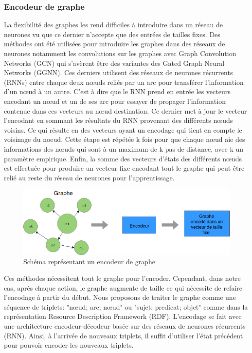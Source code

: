 \subsubsection*{Encodeur de graphe}
La flexibilité des graphes les rend difficiles à introduire dans un réseau de neurones vu que ce dernier n'accepte que des entrées de tailles fixes. Des méthodes ont été utilisées pour introduire les graphes dans des réseaux de neurones notamment les convolutions sur les graphes avec Graph Convolution Networks (GCN)\citep{KipfW17} qui s'avèrent être des variantes des Gated Graph Neural Networks (GGNN)\citep{Li2016GatedGS}. Ces derniers utilisent des réseaux de neurones récurrents (RNNs) entre chaque deux n\oe{}uds reliés par un arc pour transférer l'information d'un n\oe{}ud à un autre. C'est à dire que le RNN prend en entrée les vecteurs encodant un n\oe{}ud et un de ses arc pour essayer de propager l'information contenue dans ces vecteurs au n\oe{}ud destination. Ce dernier met à jour le vecteur l'encodant en sommant les résultats du RNN provenant des différents n\oe{}uds voisins. Ce qui résulte en des vecteurs ayant un encodage qui tient en compte le voisinage du noeud. Cette étape est répétée k fois pour que chaque n\oe{}ud aie des informations des n\oe{}uds qui sont à un maximum de k pas de distance, avec k un paramètre empirique. Enfin, la somme des vecteurs d'états des différents n\oe{}uds est effectuée pour produire un vecteur fixe encodant tout le graphe qui peut être relié au reste du réseau de neurones pour l'apprentissage.
\begin{figure}[H] 
	\centering
	\includegraphics[width=0.9\linewidth]{images/Conception/DM/encoder.png}
	\caption{Schéma représentant un encodeur de graphe}
	
\end{figure}\label{encoder}
Ces méthodes nécessitent tout le graphe pour l'encoder. Cependant, dans notre cas, après chaque action, le graphe augmente de taille ce qui nécessite de refaire l'encodage à partir du début. Nous proposons de traiter le graphe comme une séquence de triplets: "n\oe{}ud; arc; n\oe{}ud" ou "sujet; predicat; objet" comme dans la représentation Resource Description Framework (RDF). L'encodage se fait avec une architecture encodeur-décodeur basée sur des réseaux de neurones récurrents (RNN). Ainsi, à l'arrivée de nouveaux triplets, il suffit d'utiliser l'état précédent pour pouvoir encoder les nouveaux triplets.
